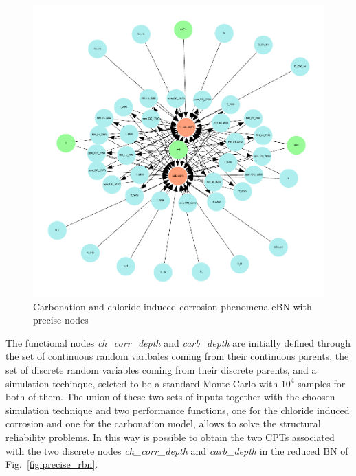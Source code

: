 \begin{figure}[]
    \centering
    \includegraphics[width=\linewidth]{imgs/pdfs/12_total_ebn_precise.pdf}
    \caption{Carbonation and chloride induced corrosion phenomena eBN with precise nodes}\label{fig:precise_ebn}
\end{figure}

The functional nodes \textit{ch\_corr\_depth} and \textit{carb\_depth} are initially defined through the set of continuous random varibales coming from their continuous parents, the set of discrete random variables coming from their discrete parents, and a simulation techinque, selcted to be a standard Monte Carlo with $10^4$ samples for both of them. The union of these two sets of inputs together with the choosen simulation technique and two performance functions, one for the chloride induced corrosion and one for the carbonation model, allows to solve the structural reliability problems. In this way is possible to obtain the two CPTs associated with the two discrete nodes \textit{ch\_corr\_depth} and \textit{carb\_depth} in the reduced BN of Fig.~\ref{fig:precise_rbn}. 

